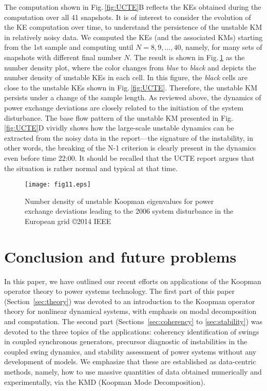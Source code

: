 \documentclass[a4paper,10pt]{article}
\begin{document}
%
The computation shown in Fig.\,\ref{fig:UCTE}B reflects the KEs obtained during the computation over all 41 snapshots.  
It is of interest to consider the evolution of the KE computation over time, to understand the persistence of the unstable KM in relatively noisy data.  
We computed the KEs (and the associated KMs) starting from the 1st sample and computing until $N=8,9,\ldots,40$, namely, for many sets of snapshots with different final number $N$.  
The result is shown in Fig.\,\ref{fig:UCTE_density} as the number density plot, where the color changes from \emph{blue} to \emph{black} and depicts the number density of unstable KEs in each cell. 
In this figure, the \emph{black} cells are close to the unstable KEs shown in Fig.\,\ref{fig:UCTE}.   
Therefore, the unstable KM persists under a change of the sample length.  
As reviewed above, the dynamics of power exchange deviations are closely related to the initiation of the system disturbance.  
The base flow pattern of the unstable KM presented in Fig.\,\ref{fig:UCTE}D vividly shows how the large-scale unstable dynamics can be extracted from the noisy data in the report---the signature of the instability, in other words, the breaking of the N-1 criterion is clearly present in the dynamics even before time 22:00.  
It should be recalled that the UCTE report argues that the situation is rather normal and typical at that time.

%
\begin{figure}[t] %
\centering
\texttt{[image: fig11.eps]}
\caption{%
Number density of unstable Koopman eigenvalues for power exchange deviations leading to the 2006 system disturbance in the European grid 
\copyright 2014 IEEE
}%
\label{fig:UCTE_density}
\end{figure}


\section{Conclusion and future problems}
\label{sec:outro}

In this paper, we have outlined our recent efforts on applications of the Koopman operator theory to power systems technology.  
The first part of this paper (Section~\ref{sec:theory}) was devoted to an introduction to the Koopman operator theory for nonlinear dynamical systems, with emphasis on modal decomposition and computation.  
The second part (Sections~\ref{sec:coherency} to \ref{sec:stability}) was devoted to the three topics of the applications:  coherency identification of swings in coupled synchronous generators, precursor diagnostic of instabilities in the coupled swing dynamics, and stability assessment of power systems without any development of models.  
We emphasize that these are established as data-centric methods, namely, how to use massive quantities of data obtained numerically and experimentally, via the KMD (Koopman Mode Decomposition).  
\end{document}
